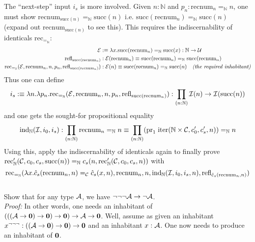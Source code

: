 The ``next-step'' input $i_{s}$ is more involved. Given $n : \mathbb{N}$ and $p_{n} : \text{recnum}_{n} =_{\mathbb{N}} n$, one must show $\text{recnum}_{\text{succ}(n)} =_{\mathbb{N}} \text{succ}(n)$ i.e. $\text{succ}(\text{recnum}_{n}) =_{\mathbb{N}} \text{succ}(n)$ (expand out $\text{recnum}_{\text{succ}(n)}$ to see this). This requires the indiscernability of identicals $\text{rec}_{=_{\mathbb{N}}}$:
\begin{align*}
	\mathcal{E} &:\equiv \lambda x.\text{succ}(\text{recnum}_{n}) =_{\mathbb{N}} \text{succ}(x) : \mathbb{N} \to \mathcal{U} \\
	\text{refl}_{\text{succ}(\text{recnum}_{n})} &: \mathcal{E}(\text{recnum}_{n}) \equiv \text{succ}(\text{recnum}_{n}) =_{\mathbb{N}} \text{succ}(\text{recnum}_{n}) \\
	\text{rec}_{=_{\mathbb{N}}}(\mathcal{E}, \text{recnum}_{n}, n, p_{n}, \text{refl}_{\text{succ}(\text{recnum}_{n})}) &: \mathcal{E}(n) \equiv \text{succ}(\text{recnum}_{n}) =_{\mathbb{N}} \text{succ}(n) \quad \textit{(the required inhabitant)}
\end{align*}
Thus one can define
\[
	i_{s} :\equiv \lambda n. \lambda p_{n}. \text{rec}_{=_{\mathbb{N}}}(\mathcal{E}, \text{recnum}_{n}, n, p_{n}, \text{refl}_{\text{succ}(\text{recnum}_{n})}) : \prod_{(n : \mathbb{N})} \mathcal{I}(n) \to \mathcal{I}(\text{succ}(n))
\]
and one gets the sought-for propositional equality
\[
	\text{ind}_{\mathbb{N}}(\mathcal{I}, i_{0}, i_{s}) : \prod_{(n : \mathbb{N})} \text{recnum}_{n} =_{\mathbb{N}} n \equiv \prod_{(n : \mathbb{N})}(\text{pr}_{1}\;\text{iter}(\mathbb{N} \times \mathcal{C}, c'_{0}, c'_{s}, n)) =_{\mathbb{N}} n
\]
Using this, apply the indiscernability of identicals again to finally prove $\text{rec}'_{\mathbb{N}}(\mathcal{C}, c_{0}, c_{s}, \text{succ}(n)) =_{\mathbb{N}} c_{s}(n,\text{rec}'_{\mathbb{N}}(\mathcal{C}, c_{0}, c_{s}, n))$ with
\[
	\text{rec}_{=_{\mathbb{N}}}(\lambda x. \hat{c}_{s}(\text{recnum}_{n},n) =_{\mathcal{C}} \hat{c}_{s}(x,n), \text{recnum}_{n}, n, \text{ind}_{\mathbb{N}}(\mathcal{I}, i_{0}, i_{s}, n), \text{refl}_{\hat{c}_{s}(\text{recnum}_{n},n)})
\] \\



 Show that for any type $\mathcal{A}$, we have $\neg\neg\neg \mathcal{A} \to \neg \mathcal{A}$. \\


\textit{Proof:} In other words, one needs an inhabitant of $(((\mathcal{A} \to \textbf{0}) \to \textbf{0}) \to \textbf{0}) \to \mathcal{A} \to \textbf{0}$. Well, assume as given an inhabitant $x^{\neg\neg\neg} : ((\mathcal{A} \to \textbf{0}) \to \textbf{0}) \to \textbf{0}$ and an inhabitant $x : \mathcal{A}$. One now needs to produce an inhabitant of $\textbf{0}$.


